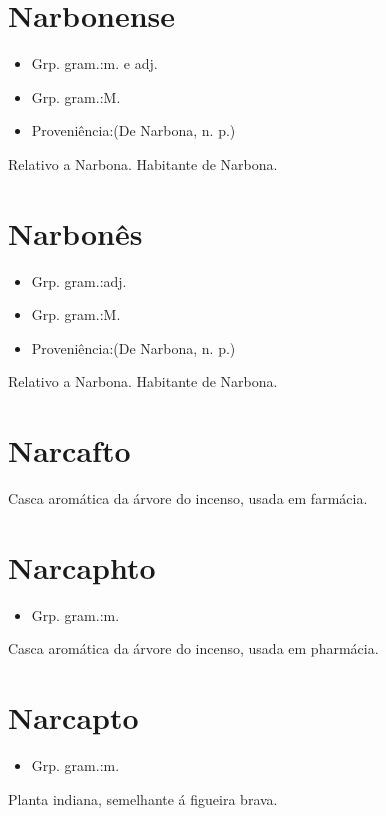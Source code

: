 \section{Narbonense}
\begin{itemize}
\item {Grp. gram.:m. e adj.}
\end{itemize}
\begin{itemize}
\item {Grp. gram.:M.}
\end{itemize}
\begin{itemize}
\item {Proveniência:(De \textunderscore Narbona\textunderscore , n. p.)}
\end{itemize}
Relativo a Narbona.
Habitante de Narbona.
\section{Narbonês}
\begin{itemize}
\item {Grp. gram.:adj.}
\end{itemize}
\begin{itemize}
\item {Grp. gram.:M.}
\end{itemize}
\begin{itemize}
\item {Proveniência:(De \textunderscore Narbona\textunderscore , n. p.)}
\end{itemize}
Relativo a Narbona.
Habitante de Narbona.
\section{Narcafto}
Casca aromática da árvore do incenso, usada em farmácia.
\section{Narcaphto}
\begin{itemize}
\item {Grp. gram.:m.}
\end{itemize}
Casca aromática da árvore do incenso, usada em pharmácia.
\section{Narcapto}
\begin{itemize}
\item {Grp. gram.:m.}
\end{itemize}
Planta indiana, semelhante á figueira brava.
